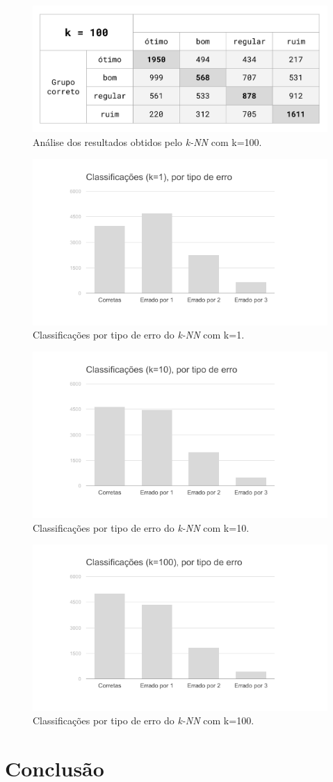 \documentclass[12pt]{article}
\begin{document}
\begin{figure}[H]
\centering\includegraphics[width=.60\linewidth]{plot-white100.png}
\caption{Análise dos resultados obtidos pelo \emph{k-NN} com k=100.}
\label{fig:tab100}
\end{figure}

\begin{figure}[H]
\centering\includegraphics[width=.65\linewidth]{graf-white1.png}
\caption{Classificações por tipo de erro do \emph{k-NN} com k=1.}
\label{fig:graf1}
\end{figure}

\begin{figure}[H]
\centering\includegraphics[width=.65\linewidth]{graf-white10.png}
\caption{Classificações por tipo de erro do \emph{k-NN} com k=10.}
\label{fig:graf10}
\end{figure}

\begin{figure}[H]
\centering\includegraphics[width=.65\linewidth]{graf-white100.png}
\caption{Classificações por tipo de erro do \emph{k-NN} com k=100.}
\label{fig:graf100}
\end{figure}

\section{Conclusão}
\label{sec:conclusao}
\end{document}
